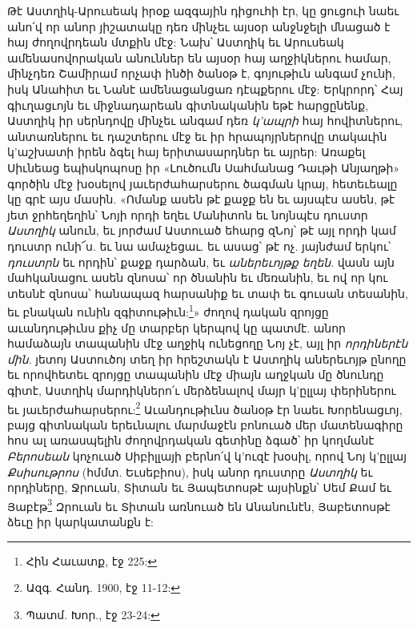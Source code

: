 \documentclass{article}
\begin{document}
{Թէ Աստղիկ-Արուսեակ իրօք ազգային դիցուհի էր, կը ցուցուի նաեւ անո՛վ որ անոր յիշատակը դեռ մինչեւ այսօր անջնջելի մնացած է հայ ժողովրդեան մտքին մէջ: Նախ՝ Աստղիկ եւ Արուսեակ ամենասովորական անուններ են այսօր հայ աղջիկներու համար, մինչդեռ Շամիրամ որչափ ինծի ծանօթ է, գոյութիւն անգամ չունի, իսկ Անահիտ եւ Նանէ ամենացանցառ դէպքերու մէջ: Երկրորդ՝ Հայ գիւղացւոյն եւ միջնադարեան գիտնականին եթէ հարցընենք, Աստղիկ իր սերնդովը մինչեւ անգամ դեռ \emph{կ'ապրի} հայ հովիտներու, անտառներու եւ դաշտերու մէջ եւ իր հրապոյրներովը տակաւին կ'աշխատի իրեն ձգել հայ երիտասարդներ եւ այրեր: Առաքել Սիւնեաց եպիսկոպոսը իր «Լուծումն Սահմանաց Դաւթի Անյաղթի» գործին մէջ խօսելով յաւերժահարսերու ծագման կրայ, հետեւեալը կը գրէ այս մասին. «Ոմանք ասեն թէ քաջք են եւ այսպէս ասեն, թէ յետ ջրհեղեղին՝ Նոյի որդի եղեւ Մանիտոն եւ նոյնպէս դուստր \emph{Աստղիկ} անուն, եւ յորժամ Աստուած եհարց զՆոյ՝ թէ այլ որդի կամ դուստր ունի՜ս. եւ նա ամաչեցաւ. եւ ասաց՝ թէ ոչ. յայնժամ երկու՝ \emph{դուստրն} եւ որդին՝ քաջք դարձան, եւ \emph{աներեւոյթք եղեն}. վասն այն մահկանացու ասեն զնոսա՝ որ ծնանին եւ մեռանին, եւ ով որ կու տեսնէ զնոսա՝ հանապազ հարսանիք եւ տափ եւ գուսան տեսանին, եւ բնական ունին զգիտութիւն:\footnote{Հին Հաւատք, էջ 225:}» ժողով դական զրոյցը աւանդութիւնս քիչ մը տարբեր կերպով կը պատմէ. անոր համաձայն տապանին մէջ աղջիկ ունեցողը Նոյ չէ, այլ իր \emph{որդիներէն մին}. յետոյ Աստուծոյ տեղ իր հրեշտակն է Աստղիկ աներեւոյթ ընողը եւ որովհետեւ զրոյցը տապանին մէջ միայն աղջկան մը ծնունդը գիտէ, Աստղիկ մարդիկներո՛ւ մերձենալով մայր կ'ըլլայ փերիներու եւ յաւերժահարսերու:\footnote{Ազգ. Հանդ. 1900, էջ 11-12:} Աւանդութիւնս ծանօթ էր նաեւ Խորենացւոյ, բայց գիտնական երեւնալու մարմաջէն բոնուած մեր մատենագիրը հոս ալ առասպելին ժողովրդական գետինը ձգած՝ իր կողմանէ \emph{Բերոսեան} կոչուած Սիբիլլայի բերնո՛վ կ'ուզէ խօսիլ, որով Նոյ կ'ըլլայ \emph{Քսիսութրոս} (հմմտ. Եւսեբիոս), իսկ անոր դուստրը \emph{Աստղիկ} եւ որդիները, Ջրուան, Տիտան եւ Յապետոսթէ այսինքն՝ Սեմ Քամ եւ Յաբէթ\footnote{Պատմ. Խոր., էջ 23-24:} Զրուան եւ Տիտան առնուած են Անանունէն, Յաբետոսթէ ձեւը իր կարկատանքն է:

}
\end{document}
